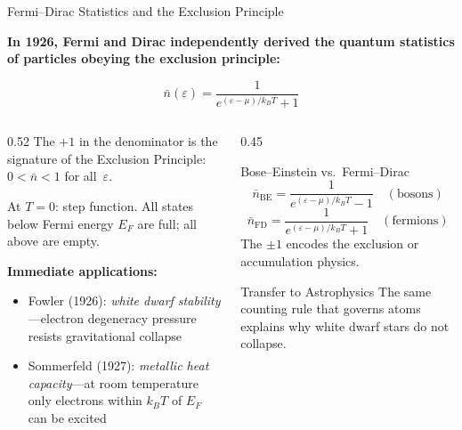 \documentclass[aspectratio=169,12pt]{beamer}
\begin{document}
\begin{frame}[shrink=20]{Fermi--Dirac Statistics and the Exclusion Principle}

\textbf{In 1926, Fermi and Dirac independently derived the quantum statistics
of particles obeying the exclusion principle:}

\[
  \bar{n}(\varepsilon) = \frac{1}{e^{(\varepsilon-\mu)/k_BT} + 1}
\]

\begin{columns}[T]
\begin{column}{0.52\textwidth}
The \textbf{$+1$} in the denominator is the signature of the Exclusion Principle:
$0 < \bar n < 1$ for all~$\varepsilon$.

\medskip
At $T=0$: step function.  All states below Fermi energy $E_F$ are full;
all above are empty.

\bigskip
\textbf{Immediate applications:}
\begin{itemize}
  \item Fowler (1926): \emph{white dwarf stability}---electron degeneracy
    pressure resists gravitational collapse
  \item Sommerfeld (1927): \emph{metallic heat capacity}---at room temperature
    only electrons within $k_BT$ of $E_F$ can be excited
\end{itemize}
\end{column}
\begin{column}{0.45\textwidth}
\begin{alertblock}{Bose--Einstein vs.\ Fermi--Dirac}
\[
  \bar n_{\text{BE}} = \frac{1}{e^{(\varepsilon-\mu)/k_BT} - 1}
  \quad (\text{bosons})
\]
\[
  \bar n_{\text{FD}} = \frac{1}{e^{(\varepsilon-\mu)/k_BT} + 1}
  \quad (\text{fermions})
\]
The $\pm 1$ encodes the exclusion or
accumulation physics.
\end{alertblock}

\bigskip
\begin{block}{Transfer to Astrophysics}
The same counting rule that governs
atoms explains why white dwarf stars
do not collapse.
\end{block}
\end{column}
\end{columns}

\end{frame}
\end{document}
